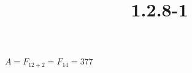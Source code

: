 \documentclass{article}
\title{1.2.8-1}
\begin{document}
\maketitle

\( A = F_{12+2} = F_{14} = 377 \)
\end{document}
